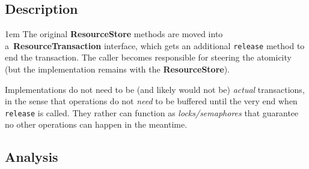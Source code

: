 \documentclass[10pt]{article}
\newenvironment{Note}
  {\begin{multicols}{3}%
     \parskip 1em}
  {\end{multicols}}
\begin{document}
\subsection*{Description}

\begin{Note}
The original \textbf{ResourceStore} methods
are moved into a~\textbf{ResourceTransaction} interface,
which gets an additional \verb!release! method
to end the transaction.
The caller becomes responsible for steering the atomicity
(but the implementation remains with the \textbf{ResourceStore}).

\columnbreak
Implementations do not need to be
(and likely would not be)
\emph{actual} transactions,
in the sense that operations do not \emph{need}
to be buffered until the very end when \verb!release! is called.
They rather can function as \emph{locks/semaphores}
that guarantee no other operations
can happen in the meantime.

\columnbreak
\null

\end{Note}

\subsection*{Analysis}
\end{document}
